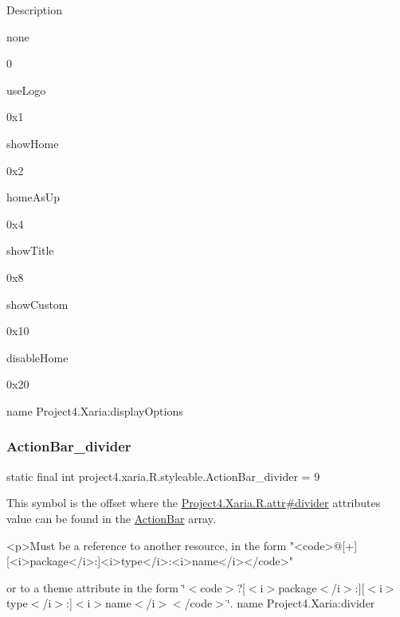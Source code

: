 Description 

{\ttfamily none}

0

{\ttfamily use\+Logo}

0x1

{\ttfamily show\+Home}

0x2

{\ttfamily home\+As\+Up}

0x4

{\ttfamily show\+Title}

0x8

{\ttfamily show\+Custom}

0x10

{\ttfamily disable\+Home}

0x20

name Project4.\+Xaria\+:display\+Options \mbox{\label{classproject4_1_1xaria_1_1R_1_1styleable_aa7f5948a8f73f6442f4be22fae96c835}} 
\subsubsection{\texorpdfstring{Action\+Bar\+\_\+divider}{ActionBar\_divider}}
{\footnotesize\ttfamily static final int project4.\+xaria.\+R.\+styleable.\+Action\+Bar\+\_\+divider = 9\hspace{0.3cm}{\ttfamily [static]}}

This symbol is the offset where the \hyperlink{}{Project4.\+Xaria.\+R.\+attr\#divider} attribute\textquotesingle{}s value can be found in the \hyperlink{classproject4_1_1xaria_1_1R_1_1styleable_accb530194c58ee3abb15587da8869e99}{Action\+Bar} array.

\begin{DoxyVerb}      <p>Must be a reference to another resource, in the form "<code>@[+][<i>package</i>:]<i>type</i>:<i>name</i></code>"
\end{DoxyVerb}
 or to a theme attribute in the form \char`\"{}$<$code$>$?\mbox{[}$<$i$>$package$<$/i$>$\+:\mbox{]}\mbox{[}$<$i$>$type$<$/i$>$\+:\mbox{]}$<$i$>$name$<$/i$>$$<$/code$>$\char`\"{}.  name Project4.\+Xaria\+:divider \mbox{\label{classproject4_1_1xaria_1_1R_1_1styleable_a538cdc9cda0d9026935ab8949327a1a4}} 
